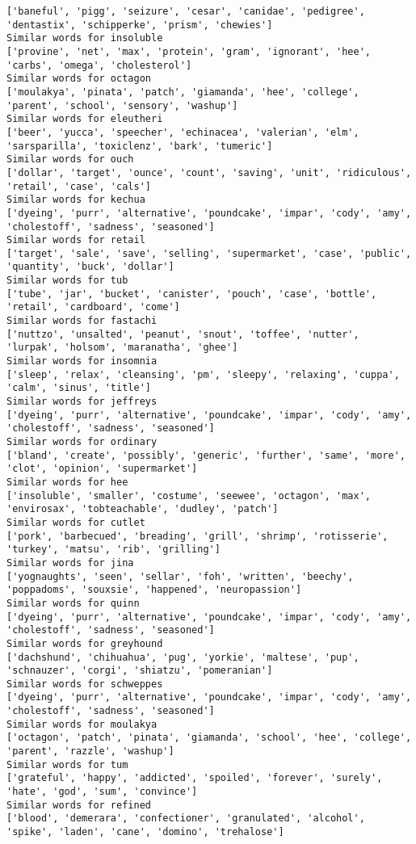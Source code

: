 \documentclass[11pt]{article}
\begin{document}
\begin{Verbatim}[commandchars=\\\{\}]
['baneful', 'pigg', 'seizure', 'cesar', 'canidae', 'pedigree', 'dentastix', 'schipperke', 'prism', 'chewies']
Similar words for insoluble
['provine', 'net', 'max', 'protein', 'gram', 'ignorant', 'hee', 'carbs', 'omega', 'cholesterol']
Similar words for octagon
['moulakya', 'pinata', 'patch', 'giamanda', 'hee', 'college', 'parent', 'school', 'sensory', 'washup']
Similar words for eleutheri
['beer', 'yucca', 'speecher', 'echinacea', 'valerian', 'elm', 'sarsparilla', 'toxiclenz', 'bark', 'tumeric']
Similar words for ouch
['dollar', 'target', 'ounce', 'count', 'saving', 'unit', 'ridiculous', 'retail', 'case', 'cals']
Similar words for kechua
['dyeing', 'purr', 'alternative', 'poundcake', 'impar', 'cody', 'amy', 'cholestoff', 'sadness', 'seasoned']
Similar words for retail
['target', 'sale', 'save', 'selling', 'supermarket', 'case', 'public', 'quantity', 'buck', 'dollar']
Similar words for tub
['tube', 'jar', 'bucket', 'canister', 'pouch', 'case', 'bottle', 'retail', 'cardboard', 'come']
Similar words for fastachi
['nuttzo', 'unsalted', 'peanut', 'snout', 'toffee', 'nutter', 'lurpak', 'holsom', 'maranatha', 'ghee']
Similar words for insomnia
['sleep', 'relax', 'cleansing', 'pm', 'sleepy', 'relaxing', 'cuppa', 'calm', 'sinus', 'title']
Similar words for jeffreys
['dyeing', 'purr', 'alternative', 'poundcake', 'impar', 'cody', 'amy', 'cholestoff', 'sadness', 'seasoned']
Similar words for ordinary
['bland', 'create', 'possibly', 'generic', 'further', 'same', 'more', 'clot', 'opinion', 'supermarket']
Similar words for hee
['insoluble', 'smaller', 'costume', 'seewee', 'octagon', 'max', 'envirosax', 'tobteachable', 'dudley', 'patch']
Similar words for cutlet
['pork', 'barbecued', 'breading', 'grill', 'shrimp', 'rotisserie', 'turkey', 'matsu', 'rib', 'grilling']
Similar words for jina
['yognaughts', 'seen', 'sellar', 'foh', 'written', 'beechy', 'poppadoms', 'souxsie', 'happened', 'neuropassion']
Similar words for quinn
['dyeing', 'purr', 'alternative', 'poundcake', 'impar', 'cody', 'amy', 'cholestoff', 'sadness', 'seasoned']
Similar words for greyhound
['dachshund', 'chihuahua', 'pug', 'yorkie', 'maltese', 'pup', 'schnauzer', 'corgi', 'shiatzu', 'pomeranian']
Similar words for schweppes
['dyeing', 'purr', 'alternative', 'poundcake', 'impar', 'cody', 'amy', 'cholestoff', 'sadness', 'seasoned']
Similar words for moulakya
['octagon', 'patch', 'pinata', 'giamanda', 'school', 'hee', 'college', 'parent', 'razzle', 'washup']
Similar words for tum
['grateful', 'happy', 'addicted', 'spoiled', 'forever', 'surely', 'hate', 'god', 'sum', 'convince']
Similar words for refined
['blood', 'demerara', 'confectioner', 'granulated', 'alcohol', 'spike', 'laden', 'cane', 'domino', 'trehalose']

\end{Verbatim}
\end{document}
